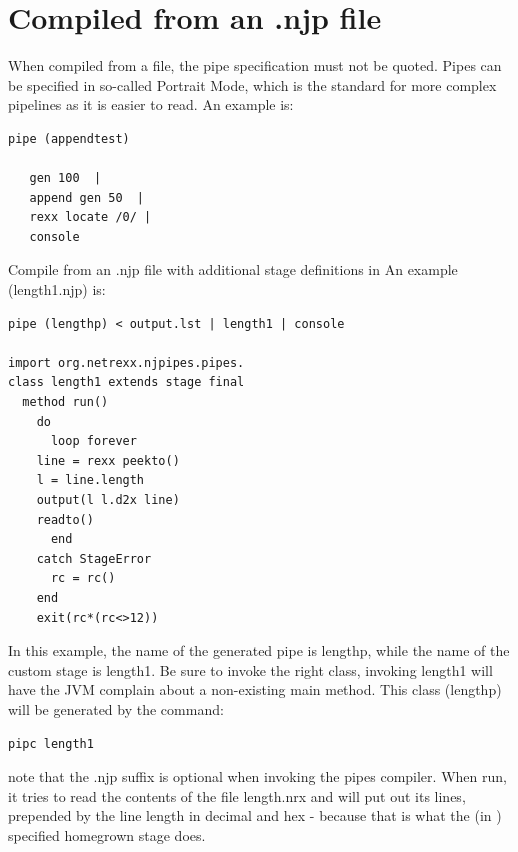 \section{Compiled from an .njp file}
When compiled from a file, the pipe specification must not be quoted. Pipes can be specified in so-called Portrait Mode, which is the standard for more complex pipelines as it is easier to read.
An example is:
\begin{lstlisting}
pipe (appendtest)
 
   gen 100  |
   append gen 50  |
   rexx locate /0/ |
   console
\end{lstlisting}
Compile from an .njp file with additional stage definitions in \nr{}
An example (length1.njp) is:
\begin{lstlisting}
pipe (lengthp) < output.lst | length1 | console

import org.netrexx.njpipes.pipes.
class length1 extends stage final
  method run()
    do
      loop forever
    line = rexx peekto()
    l = line.length
    output(l l.d2x line)
    readto()
      end
    catch StageError
      rc = rc()
    end
    exit(rc*(rc<>12))
\end{lstlisting}
In this example, the name of the generated pipe is lengthp, while the name of the custom stage is length1. Be sure to invoke the right class, invoking length1 will have the JVM complain about a non-existing main method.
This class (lengthp) will be generated by the command:
\begin{verbatim}
pipc length1
\end{verbatim}
note that the .njp suffix is optional when invoking the pipes
compiler. When run, it tries to read the contents of the file
length.nrx and will put out its lines, prepended by the line length in
decimal and hex - because that is what the (in \nr{}) specified
homegrown stage does.





%  

